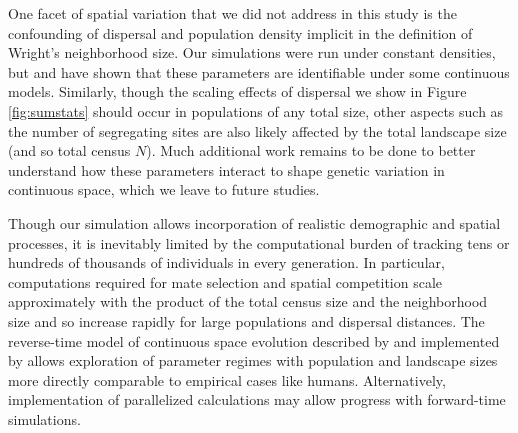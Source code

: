 \documentclass[10pt,twoside,lineno,hidelinks]{preprint}
\begin{document}

One facet of spatial variation that we did not address in this study is the confounding of dispersal and population density implicit in the definition of Wright's neighborhood size. Our simulations were run under constant densities, but \cite{guindon2016demographic} and \citet{Ringbauer2017} 
have shown that these parameters are identifiable under some continuous models. Similarly, though the scaling effects of dispersal we show in Figure \ref{fig:sumstats} should occur in populations of any total size, other aspects such as the number of segregating sites are also likely affected by the total landscape size (and so total census $N$). Much additional work remains to be done to better understand how these parameters interact to shape genetic variation in continuous space, which we leave to future studies. 

Though our simulation allows incorporation of realistic demographic and spatial processes, 
it is inevitably limited by the computational burden of tracking tens or hundreds of thousands of individuals in every generation. 
In particular, computations required for mate selection and spatial competition scale approximately with the product of the total census size and the neighborhood size and so increase rapidly for large populations and dispersal distances. 
The reverse-time model of continuous space evolution described by \citet{Barton2010} and implemented by \citet{Kelleher2014} 
allows exploration of parameter regimes with population and landscape sizes more directly comparable to empirical cases like humans. 
Alternatively, implementation of parallelized calculations may allow progress with forward-time simulations.
\end{document}
